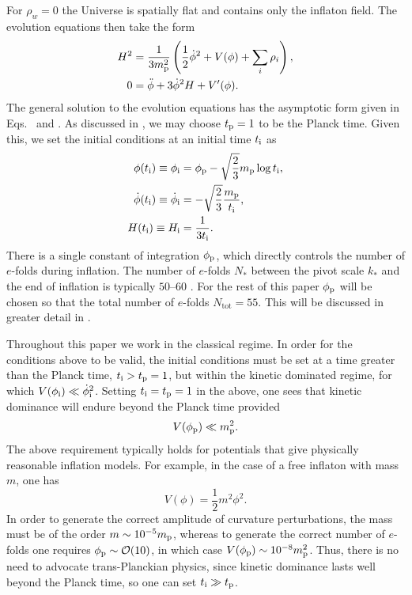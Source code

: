 For $\rho_w=0$ the Universe is spatially flat and contains only the
inflaton field. The evolution equations then take the form
%
\begin{align}
  H^2 
  &= 
  \frac{1}{3m_{\mathrm{p}}^2}
  \left(\frac{1}{2}\dot{\phi}^2 + V(\phi) + \sum_i\rho_i\right),
  \label{eqn:Friedmann_eq} 
  \\
  0
  &= 
  \ddot{\phi} +3\dot{\phi}^2H + V^\prime(\phi).
  \label{eqn:Motion_eq_Scalar}
\end{align}
%
The general solution to the evolution equations has the asymptotic
form given in Eqs.\  and
. As discussed in , we may
choose $t_{\mathrm{p}}=1$ to be the Planck time. Given this, we set the initial
conditions at an initial time $t_{\mathrm{i}}$ as
%
\begin{align}
  \phi(t_{\mathrm{i}}) \equiv \phi_{\mathrm{i}}
  &= 
  \phi_{\mathrm{p}} - \sqrt{\frac{2}{3}}m_{\mathrm{p}}\log t_{\mathrm{i}}, 
  \label{eqn:phi_ic}
  \\
  \dot\phi(t_{\mathrm{i}}) 
  \equiv 
  \dot\phi_{\mathrm{i}}
  &= 
  -\sqrt{\frac{2}{3}}\frac{m_{\mathrm{p}}}{t_{\mathrm{i}}}, 
  \label{eqn:phid_ic}
  \\
  H(t_{\mathrm{i}}) 
  \equiv 
  H_{\mathrm{i}}
  &= 
  \frac{1}{3t_{\mathrm{i}}}. 
  \label{eqn:H_ic}
\end{align}
There is a single constant of integration $\phi_{\mathrm{p}}$, which directly
controls the number of $e$-folds during inflation. The number of
$e$-folds $N_*$ between the pivot scale $k_*$ and the end of inflation
is typically $50$--$60$ \citep{planck_collaboration_planck_2013-1}. For
the rest of this paper $\phi_{\mathrm{p}}$ will be chosen so that the total number
of $e$-folds $N_\mathrm{tot}=55$. This will be discussed in greater
detail in .

Throughout this paper we work in the classical regime. In order for
the conditions above to be valid, the initial conditions must be set
at a time greater than the Planck time, $t_{\mathrm{i}} >t_{\mathrm{p}}=1$, but within the
kinetic dominated regime, for which $V(\phi_{\mathrm{i}}) \ll \dot\phi_{\mathrm{i}}^2$. Setting
$t_{\mathrm{i}}=t_{\mathrm{p}}=1$ in the above, one sees that kinetic dominance will endure
beyond the Planck time provided
%
\begin{equation}
  V(\phi_{\mathrm{p}}) \ll m_{\mathrm{p}}^2.
\end{equation}
%
The above requirement typically holds for potentials that give
physically reasonable inflation models. For example, in the case of a
free inflaton with mass $m$, one has \[ V(\phi) = \frac{1}{2}m^2
\phi^2.\] In order to generate the correct amplitude of curvature
perturbations, the mass must be of the order $m\sim10^{-5}m_{\mathrm{p}}$, whereas
to generate the correct number of $e$-folds one requires
$\phi_{\mathrm{p}}\sim\mathcal{O}(10)$, in which case $V(\phi_{\mathrm{p}}) \sim 10^{-8}
m_{\mathrm{p}}^2$.  Thus, there is no need to advocate trans-Planckian physics,
since kinetic dominance lasts well beyond the Planck time, so one can
set $t_{\mathrm{i}} \gg t_{\mathrm{p}}$.


